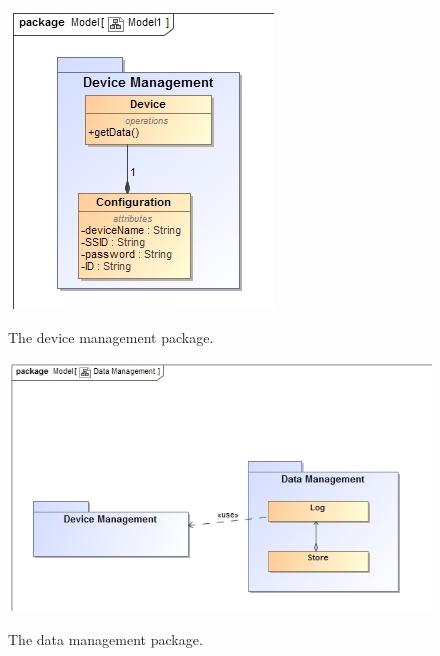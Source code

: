 \documentclass[paper=a4, fontsize=11pt]{scrartcl} %
\begin{document}
	\begin{figure}
		\includegraphics[width=\textwidth]{images/DeviceManagement.jpg}  \\
		\caption{The device management package.}
	\end{figure}
	
	\begin{figure}
		\includegraphics[width=\textwidth]{images/DataManagement.jpg}  \\
		\caption{The data management package.}
	\end{figure}
	
\end{document}

